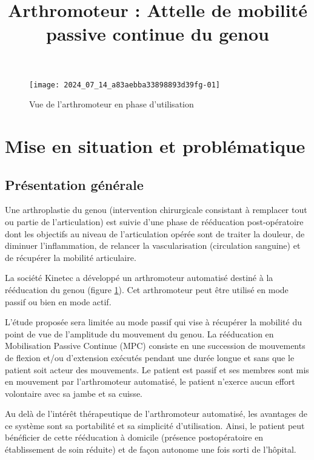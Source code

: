 

\title{Arthromoteur : Attelle de mobilité passive continue du genou }
\maketitle
\begin{figure}[!h]
\texttt{[image: 2024\_07\_14\_a83aebba33898893d39fg-01]}

\caption{\label{fig:ccs_mp_2024:fig:01} Vue de l'arthromoteur en phase d'utilisation}
\end{figure}

\section{Mise en situation et problématique}
\subsection{Présentation générale}
Une arthroplastie du genou (intervention chirurgicale consistant à remplacer tout ou partie de l'articulation) est suivie d'une phase de rééducation post-opératoire dont les objectifs au niveau de l'articulation opérée sont de traiter la douleur, de diminuer l'inflammation, de relancer la vascularisation (circulation sanguine) et de récupérer la mobilité articulaire.

La société Kinetec a développé un arthromoteur automatisé destiné à la rééducation du genou (figure \ref{fig:ccs_mp_2024:fig:01}). Cet arthromoteur peut être utilisé en mode passif ou bien en mode actif.

L'étude proposée sera limitée au mode passif qui vise à récupérer la mobilité du point de vue de l'amplitude du mouvement du genou. La rééducation en Mobilisation Passive Continue (MPC) consiste en une succession de mouvements de flexion et/ou d'extension exécutés pendant une durée longue et sans que le patient soit acteur des mouvements. Le patient est passif et ses membres sont mis en mouvement par l'arthromoteur automatisé, le patient n'exerce aucun effort volontaire avec sa jambe et sa cuisse.

Au delà de l'intérêt thérapeutique de l'arthromoteur automatisé, les avantages de ce système sont sa portabilité et sa simplicité d'utilisation. Ainsi, le patient peut bénéficier de cette rééducation à domicile (présence postopératoire en établissement de soin réduite) et de façon autonome une fois sorti de l'hôpital.

